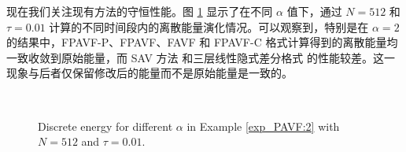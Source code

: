 现在我们关注现有方法的守恒性能。图 \ref{fig_PAVF:3} 显示了在不同 $\alpha$ 值下，通过 $N=512$ 和 $\tau=0.01$ 计算的不同时间段内的离散能量演化情况。可以观察到，特别是在 $\alpha=2$ 的结果中，FPAVF-P、FPAVF、FAVF 和 FPAVF-C 格式计算得到的离散能量均一致收敛到原始能量，而 SAV 方法 \cite{chengConvergenceEnergyconservingScheme2022} 和三层线性隐式差分格式 \cite{ranLinearlyImplicitConservative2016} 的性能较差。这一现象与后者仅保留修改后的能量而不是原始能量是一致的。

\begin{figure}[H]
	\begin{center}
	\\
	\caption{Discrete energy for different $\alpha$ in Example \ref{exp_PAVF:2} with $N = 512$ and $\tau=0.01$.} \label{fig_PAVF:3}
	\end{center}
	\end{figure}

